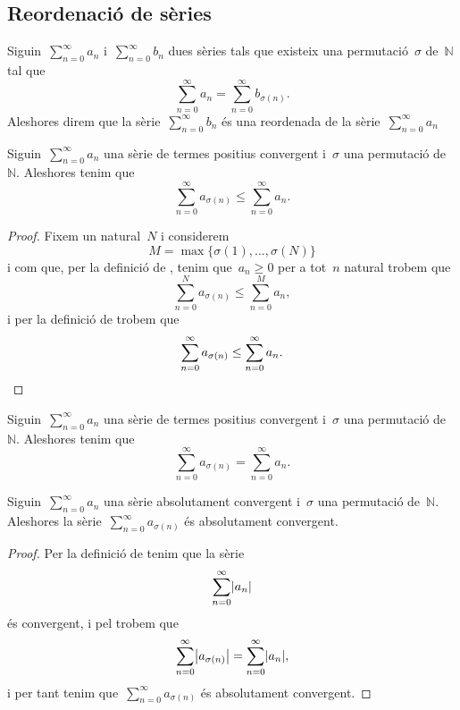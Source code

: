 \documentclass[../../main.tex]{subfiles}
\begin{document}
	\subsection{Reordenació de sèries}
	\begin{definition}
		\label{def:reordenada d'una sèrie}
		Siguin~\(\sum_{n=0}^{\infty}a_{n}\) i~\(\sum_{n=0}^{\infty}b_{n}\) dues sèries tals que existeix una permutació~\(\sigma\) de~\(\mathbb{N}\) tal que
		\[
		    \sum_{n=0}^{\infty}a_{n}=\sum_{n=0}^{\infty}b_{\sigma(n)}.
		\]
		Aleshores direm que la sèrie~\(\sum_{n=0}^{\infty}b_{n}\) és una reordenada de la sèrie~\(\sum_{n=0}^{\infty}a_{n}\)
	\end{definition}
	\begin{lemma}
		\label{lema:la reordenada d'una sèrie de termes positius convergent és més petita que la sèrie}
		Siguin~\(\sum_{n=0}^{\infty}a_{n}\) una sèrie de termes positius convergent i~\(\sigma\) una permutació de~\(\mathbb{N}\).
		Aleshores tenim que
		\[
		    \sum_{n=0}^{\infty}a_{\sigma(n)}\leq\sum_{n=0}^{\infty}a_{n}.
		\]
		\begin{proof}
			Fixem un natural~\(N\) i considerem
			\[
			    M=\max\{\sigma(1),\dots,\sigma(N)\}
			\]
			i com que, per la definició de , tenim que~\(a_{n}\geq0\) per a tot~\(n\) natural trobem que
			\[
			    \sum_{n=0}^{N}a_{\sigma(n)}\leq\sum_{n=0}^{M}a_{n},
			\]
			i per la definició de  trobem que
			\[
			    \sum_{n=0}^{\infty}a_{\sigma(n)}\leq\sum_{n=0}^{\infty}a_{n}.\qedhere
			\]
		\end{proof}
	\end{lemma}
	\begin{corollary}
		\label{cor:la reordenada d'una sèrie de termes positius convergent conserva la sèrie}
		Siguin~\(\sum_{n=0}^{\infty}a_{n}\) una sèrie de termes positius convergent i~\(\sigma\) una permutació de~\(\mathbb{N}\).
		Aleshores tenim que
		\[
		    \sum_{n=0}^{\infty}a_{\sigma(n)}=\sum_{n=0}^{\infty}a_{n}.
		\]
	\end{corollary}
	\begin{proposition}
		\label{prop:la reordenada d'una sèrie absolutament convergent és absolutament convergent}
		Siguin~\(\sum_{n=0}^{\infty}a_{n}\) una sèrie absolutament convergent i~\(\sigma\) una permutació de~\(\mathbb{N}\).
		Aleshores la sèrie~\(\sum_{n=0}^{\infty}a_{\sigma(n)}\) és absolutament convergent.
		\begin{proof}
			Per la definició de  tenim que la sèrie
			\[
			    \sum_{n=0}^{\infty}\abs{a_{n}}
			\]
			és convergent, i pel \corollari{}  trobem que
			\[
			    \sum_{n=0}^{\infty}\abs{a_{\sigma(n)}}=\sum_{n=0}^{\infty}\abs{a_{n}},
			\]
			i per tant tenim que~\(\sum_{n=0}^{\infty}a_{\sigma(n)}\) és absolutament convergent.
		\end{proof}
	\end{proposition}
\end{document}
